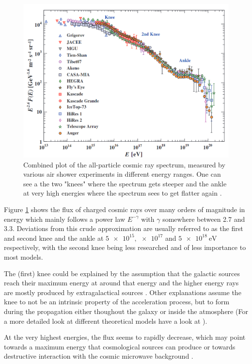 \begin{figure}
	\centering
	\includegraphics[width=.8\textwidth]{images/cr_spectrum.png}
	\caption{Combined plot of the all-particle cosmic ray spectrum,
		measured by various air shower experiments in different
		energy ranges. 
		One can see a the two "knees" where
		the spectrum gets steeper and the ankle at very high
		energies where the spectrum sees to get flatter again \cite{pdg19}. 
	}
	\label{fig:cr_spectrum}
\end{figure}

Figure \ref{fig:cr_spectrum} shows the flux of charged cosmic rays over 
many orders of magnitude in energy which mainly follows 
a power law $E^{-\gamma}$ with $\gamma$ somewhere between 
2.7 and 3.3. Deviations from this crude approximation are 
usually referred to as the first and second knee and the ankle 
at $\num{5e15}, \num{e17}$ and $\SI{5e18}{\electronvolt}$ respectively,
with the second knee being less researched and of less importance
to most models.

The (first) knee could be explained by the assumption that the galactic sources
reach their maximum energy at around that energy and the higher energy rays
are mostly produced by extragalactical sources \cite{pdg19}.
Other explanations assume the knee to not be an intrinsic property of the acceleration process,
but to form during the propagation either thoughout the galaxy or
inside the atmosphere (For a more detailed look at different 
theoretical models have a look
at \cite{HORANDEL2004241}).

At the very highest energies, the flux seems to rapidly decrease,
which may point towards a maximum energy
that cosmological sources can produce or towards destructive interaction with 
the cosmic microwave background \cite{bookap}.

